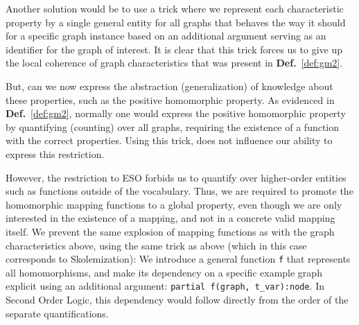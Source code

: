 \documentclass{article}
\theoremstyle{definition}
\begin{document}
Another solution would be to use a trick where we represent each characteristic property by a single general entity for all graphs that behaves the way it should for a specific graph instance based on an additional argument serving as an identifier for the graph of interest.
It is clear that this trick forces us to give up the local coherence of graph characteristics that was present in \textbf{Def.}~\ref{def:gm2}.


But, can we now express the abstraction (generalization) of knowledge about these properties, such as the positive homomorphic property.
As evidenced in \textbf{Def.}~\ref{def:gm2}, normally one would express the positive homomorphic property by quantifying (counting) over all graphs, requiring the existence of a function with the correct properties.
Using this trick, does not influence our ability to express this restriction.

However, the restriction to ESO forbids us to quantify over higher-order entities such as functions outside of the vocabulary.
Thus, we are required to promote the homomorphic mapping functions to a global property, even though we are only interested in the existence of a mapping, and not in a concrete valid mapping itself.
We prevent the same explosion of mapping functions as with the graph characteristics above, using the same trick as above (which in this case corresponds to Skolemization):
We introduce a general function \verb|f| that represents all homomorphisms, and make its dependency on a specific example graph explicit using an additional argument:
\verb|partial f(graph, t_var):node|.
In Second Order Logic, this dependency would follow directly from the order of the separate quantifications.
\end{document}
